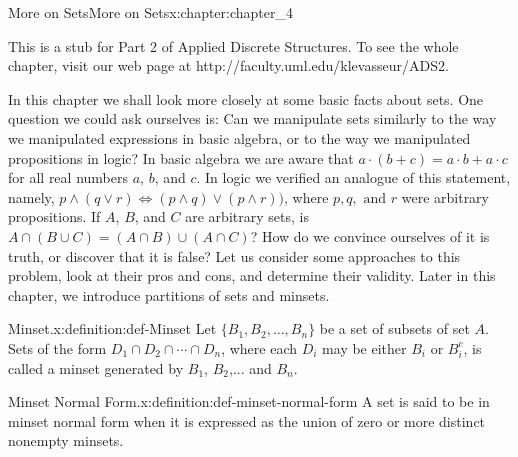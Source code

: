 \documentclass[twoside,10pt,]{book}
\numberwithin{equation}{section}
\begin{document}
\begin{chapterptx}{More on Sets}{}{More on Sets}{}{}{x:chapter:chapter_4}
\begin{introduction}{}%
This is a stub for Part 2 of Applied Discrete Structures. To see the whole chapter, visit our web page at http:\slash{}\slash{}faculty.uml.edu\slash{}klevasseur\slash{}ADS2.%
\par
In this chapter we shall look more closely at some basic facts about sets. One question we could ask ourselves is: Can we manipulate sets similarly to the way we manipulated expressions in basic algebra, or to the way we manipulated propositions in logic? In basic algebra we are aware that \(a \cdot  (b + c) = a\cdot  b + a \cdot  c\) for all real numbers \(a\), \(b\), and \(c\). In logic we verified an analogue of this statement, namely, \(p
\land  ( q \lor  r) \Leftrightarrow  (p \land  q)\lor  (p \land  r))\), where \(p, q, \textrm{ and } r\) were arbitrary propositions. If \(A\), \(B\), and \(C\) are arbitrary sets, is \(A \cap  (B \cup  C) = (A \cap  B) \cup  (A \cap  C)\)? How do we convince ourselves of it is truth, or discover that it is false? Let us consider some approaches to this problem, look at their pros and cons, and determine their validity.  Later in this chapter, we introduce partitions of sets and minsets.%
\end{introduction}%
\begin{definition}{Minset.}{x:definition:def-Minset}%
%
Let \(\{B_1, B_2,\ldots,B_n\}\) be a set of subsets of  set \(A\). Sets of the form \(D_1\cap D_2\cap
\cdots \cap D_n\), where each \(D_i\) may be either \(B_i\) or \(B_i^c\), is called a minset generated by \(B_1\), \(B_2\),... and  \(B_n\).%
\end{definition}
\begin{definition}{Minset Normal Form.}{x:definition:def-minset-normal-form}%
%
A set is said to be in minset normal form when it is expressed as the union of zero or more distinct nonempty minsets.%
\end{definition}
\end{chapterptx}
%
%
\typeout{************************************************}
\typeout{************************************************}
%
\end{document}
